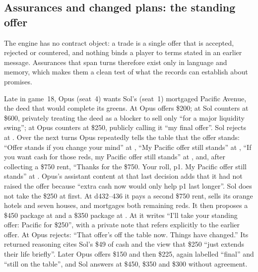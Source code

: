 \subsection{Assurances and changed plans: the  standing offer}

The engine has no contract object: a trade is a single offer that is accepted, rejected or countered, and nothing binds a player to terms stated in an earlier message. Assurances that span turns therefore exist only in language and memory, which makes them a clean test of what the records can establish about promises.

Late in game~18, Opus (seat~4) wants Sol's (seat~1) mortgaged Pacific Avenue, the deed that would complete its greens. At  Opus offers \$200; at  Sol counters at \$600, privately treating the deed as a blocker to sell only ``for a major liquidity swing''; at  Opus counters at \$250, publicly calling it ``my final offer''. Sol rejects at . Over the next turns Opus repeatedly tells the table that the offer stands: ``Offer stands if you change your mind'' at , ``My Pacific offer still stands'' at , ``If you want cash for those reds, my Pacific offer still stands'' at , and, after collecting a \$750 rent, ``Thanks for the \$750. Your roll, p1. My Pacific offer still stands'' at . Opus's assistant content at that last decision adds that it had not raised the offer because ``extra cash now would only help p1 last longer''. Sol does not take the \$250 at first. At d432--436 it pays a second \$750 rent, sells its orange hotels and seven houses, and mortgages both remaining reds. It then proposes a \$450 package at  and a \$350 package at . At  it writes ``I'll take your standing offer: Pacific for \$250'', with a private note that refers explicitly to the earlier offer. At  Opus rejects: ``That offer's off the table now. Things have changed.'' Its returned reasoning cites Sol's \$49 of cash and the view that \$250 ``just extends their life briefly''. Later Opus offers \$150 and then \$225, again labelled ``final'' and ``still on the table'', and Sol answers at \$450, \$350 and \$300 without agreement.

